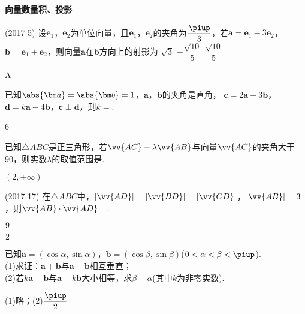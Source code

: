   \begin{exercise}{\textbf{向量数量积、投影}}
    \item%
      (2017  5)
      设$\bm e_1$，$\bm e_2$为单位向量，且$\bm e_1$，$\bm e_2$的夹角为$\dfrac{\piup}3$，若$\bm a=\bm e_1-3\bm e_2$，$\bm b=\bm e_1+\bm e_2$，则向量$\bm a$在$\bm b$方向上的射影为\xz
       {$\sqrt3$}
       {$-\dfrac{\sqrt{10}}5$}
       {$\dfrac{\sqrt{10}}5$}
      \begin{answer}
        A
      \end{answer}
    \item%
      已知$\abs{\bm a}=\abs{\bm b}=1$，$\bm a$，$\bm b$的夹角是直角，
      $\bm c=2\bm a+3\bm b$，$\bm d=k\bm a-4\bm b$，$\bm c\perp\bm d$，则$k=$\tk.
      \begin{answer}
        6
      \end{answer}
      已知$\triangle{ABC}$是正三角形，若$\vv{AC}-\lambda\vv{AB}$与向量$\vv{AC}$的夹角大于90\degree，则实数$\lambda$的取值范围是\tk.
      \begin{answer}
        $(2,+\infty)$
      \end{answer}
    \item%
      (2017  17)
      在$\triangle{ABC}$中，$|\vv{AD}|=|\vv{BD}|=|\vv{CD}|$，$|\vv{AB}|=3$，则$\vv{AB}\cdot\vv{AD}=$\tk.
      \begin{answer}
        $\dfrac92$
      \end{answer}
    \item%
      已知$\bm a=(\cos\alpha,\sin\alpha)$，$\bm b=(\cos\beta,\sin\beta)$($0<\alpha<\beta<\piup$).\\
      (1)求证：$\bm a+\bm b$与$\bm a-\bm b$相互垂直；\\
      (2)若$k\bm a+\bm b$与$\bm a-k\bm b$大小相等，求$\beta-\alpha$(其中$k$为非零实数).
      \begin{answer}
        (1)略；(2)$\dfrac{\piup}2$
      \end{answer}
    \vspace{4cm}
  \end{exercise}
